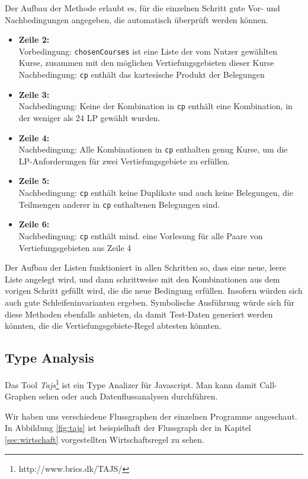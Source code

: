 \documentclass[ngerman]{article}
\begin{document}
Der Aufbau der Methode erlaubt es, für die einzelnen Schritt gute Vor- und Nachbedingungen angegeben, die automatisch überprüft werden können.
\begin{itemize}
    \item
        \textbf{Zeile 2:} \\
        Vorbedingung: \texttt{chosenCourses} ist eine Liste der vom Nutzer gewählten Kurse, zusammen mit den möglichen Vertiefungsgebieten dieser Kurse
        Nachbedingung: \texttt{cp} enthält das kartesische Produkt der Belegungen
    \item
        \textbf{Zeile 3:} \\
        Nachbedingung: Keine der Kombination in \texttt{cp} enthält eine Kombination, in der weniger als 24 LP gewählt wurden.
    \item
        \textbf{Zeile 4:} \\
        Nachbedingung: Alle Kombinationen in \texttt{cp} enthalten genug Kurse, um die LP-Anforderungen für zwei Vertiefungsgebiete zu erfüllen.
    \item
        \textbf{Zeile 5:} \\
        Nachbedingung: \texttt{cp} enthält keine Duplikate und auch keine Belegungen, die Teilmengen anderer in \texttt{cp} enthaltenen Belegungen sind.
    \item
        \textbf{Zeile 6:} \\
        Nachbedingung: \texttt{cp} enthält mind. eine Vorlesung für alle Paare von Vertiefungsgebieten aus Zeile 4
\end{itemize}
Der Aufbau der Listen funktioniert in allen Schritten so, dass eine neue, leere Liste angelegt wird, und dann schrittweise mit den Kombinationen aus dem vorigen Schritt gefüllt wird, die die neue Bedingung erfüllen.
Insofern würden sich auch gute Schleifeninvarianten ergeben.
Symbolische Ausführung würde sich für diese Methoden ebenfalls anbieten, da damit Test-Daten generiert werden könnten, die die Vertiefungsgebiete-Regel abtesten könnten.


\subsection{Type Analysis}
Das Tool \emph{Tajs}\footnote{http://www.brics.dk/TAJS/} ist ein Type Analizer für Javascript. Man kann damit Call-Graphen sehen oder auch Datenflussanalysen durchführen.

Wir haben uns verschiedene Flussgraphen der einzelnen Programme angeschaut. In Abbildung \ref{fig:tajs} ist beispielhaft der Flussgraph der in Kapitel \ref{sec:wirtschaft} vorgestellten Wirtschaftsregel zu sehen.
\end{document}
